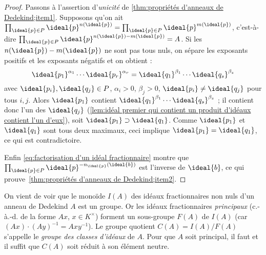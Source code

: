 \documentclass[11pt, %
  title in boldface,
  theorem in new line,
  theorem numbering = section,
  number theorems separately,
  simple name,
]{beaulivre}
\begin{document}
\begin{proof}
        Passons à l'assertion d'\emph{unicité} de \ref{thm:propriétés d'anneaux de Dedekind;item1}. Supposons qu'on ait \( \prod_{\ideal{p} \in P} \ideal{p}^{n(\ideal{p})} = \prod_{\ideal{p} \in P} \ideal{p}^{m(\ideal{p})} \), c'est-à-dire \( \prod_{\ideal{p} \in P} \ideal{p}^{n(\ideal{p})-m(\ideal{p})} = A \). Si les \( n(\ideal{p})-m(\ideal{p}) \) ne sont pas tous nuls, on sépare les exposants positifs et les exposants négatifs et on obtient :
        \begin{equation}
            \ideal{p_1}^{\alpha_1} \cdots \ideal{p_r}^{\alpha_r} = \ideal{q_1}^{\beta_1} \cdots \ideal{q_s}^{\beta_s}
        \end{equation}
        avec \( \ideal{p_i}, \ideal{q_j} \in P \), \( \alpha_i > 0 \), \( \beta_j > 0 \), \( \ideal{p_i} \neq \ideal{q_j} \) pour tous \( i,j \). Alors \( \ideal{p_1} \) contient \( \ideal{q_1}^{\beta_1} \cdots \ideal{q_s}^{\beta_s} \) ; il contient donc l'un des \( \ideal{q_j} \) (\cref{lem:idéal premier qui contient un produit d'idéaux contient l'un d'eux}), soit \( \ideal{p_1} \supset \ideal{q_1} \). Comme \( \ideal{p_1} \) et \( \ideal{q_1} \) sont tous deux maximaux, ceci implique \( \ideal{p_1} = \ideal{q_1} \), ce qui est contradictoire.

        Enfin \eqref{eq:factorisation d'un idéal fractionnaire} montre que \( \prod_{\ideal{p} \in P} \ideal{p}^{-n_{\ideal{p}}(\ideal{b})} \) est l'inverse de \( \ideal{b} \), ce qui prouve~\ref{thm:propriétés d'anneaux de Dedekind;item2}.
    \end{proof}

    \begin{remark}
        On vient de voir que le monoïde \( I(A) \) des idéaux fractionnaires non nuls d'un anneau de Dedekind \( A \) est un groupe. Or les idéaux fractionnaires \emph{principaux} (c.-à.-d. de la forme \( Ax \), \( x \in K^\times \)) forment un sous-groupe \( F(A) \) de \( I(A) \) (car \( (Ax)\cdot(Ay)^{-1} = Axy^{-1} \)). Le groupe quotient \( C(A) = I(A) / F(A) \) s'appelle le \emph{groupe des classes d'idéaux} de \( A \). Pour que \( A \) soit principal, il faut et il suffit que \( C(A) \) soit réduit à son élément neutre.
    \end{remark}
\end{document}
